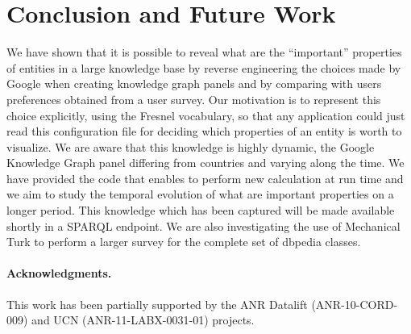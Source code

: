 \documentclass[runningheads,a4paper]{llncs}
\begin{document}

\section{Conclusion and Future Work}
\label{sec:conclusion}
We have shown that it is possible to reveal what are the ``important'' properties of entities in a large knowledge base by reverse engineering the choices made by Google when creating knowledge graph panels and by comparing with users preferences obtained from a user survey. Our motivation is to represent this choice explicitly, using the Fresnel vocabulary, so that any application could just read this configuration file for deciding which properties of an entity is worth to visualize. We are aware that this knowledge is highly dynamic, the Google Knowledge Graph panel differing from countries and varying along the time. We have provided the code that enables to perform new calculation at run time and we aim to study the temporal evolution of what are important properties on a longer period. This knowledge which has been captured will be made available shortly in a SPARQL endpoint. We are also investigating the use of Mechanical Turk to perform a larger survey for the complete set of dbpedia classes.


\paragraph{\textbf{Acknowledgments.}} %
This work has been partially supported by the ANR Datalift (ANR-10-CORD-009) and UCN (ANR-11-LABX-0031-01) projects.


\nocite{*}

\end{document}
